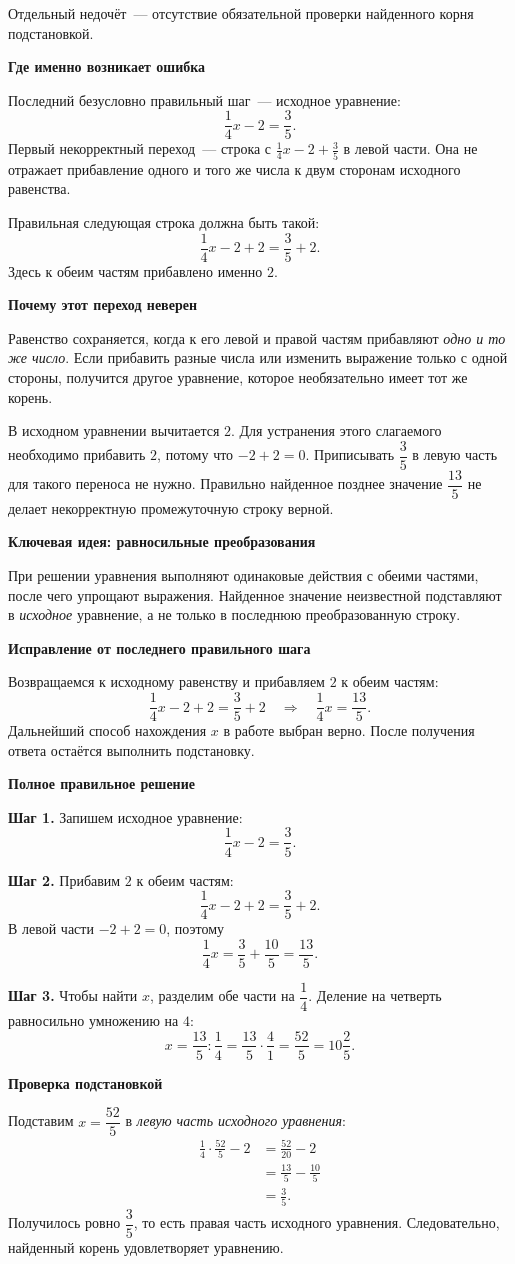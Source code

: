\documentclass[11pt,a4paper]{article}
\newcommand{\reviewpart}[1]{\par\smallskip\textbf{#1}\par\smallskip}
\begin{document}
Отдельный недочёт~--- отсутствие обязательной проверки найденного корня подстановкой.

\reviewpart{Где именно возникает ошибка}
Последний безусловно правильный шаг~--- исходное уравнение:
\[
\frac14x-2=\frac35.
\]
Первый некорректный переход~--- строка с $\frac14x-2+\frac35$ в левой части. Она не отражает прибавление одного и того же числа к двум сторонам исходного равенства.

Правильная следующая строка должна быть такой:
\[
\frac14x-2+2=\frac35+2.
\]
Здесь к обеим частям прибавлено именно $2$.

\reviewpart{Почему этот переход неверен}
Равенство сохраняется, когда к его левой и правой частям прибавляют \emph{одно и то же число}. Если прибавить разные числа или изменить выражение только с одной стороны, получится другое уравнение, которое необязательно имеет тот же корень.

В исходном уравнении вычитается $2$. Для устранения этого слагаемого необходимо прибавить $2$, потому что $-2+2=0$. Приписывать $\dfrac35$ в левую часть для такого переноса не нужно. Правильно найденное позднее значение $\dfrac{13}{5}$ не делает некорректную промежуточную строку верной.

\clearpage
\reviewpart{\textcolor{blue!60!black}{Ключевая идея:} равносильные преобразования}
При решении уравнения выполняют одинаковые действия с обеими частями, после чего упрощают выражения. Найденное значение неизвестной подставляют в \emph{исходное} уравнение, а не только в последнюю преобразованную строку.

\reviewpart{Исправление от последнего правильного шага}
Возвращаемся к исходному равенству и прибавляем $2$ к обеим частям:
\[
\frac14x-2+2=\frac35+2
\quad\Longrightarrow\quad
\frac14x=\frac{13}{5}.
\]
Дальнейший способ нахождения $x$ в работе выбран верно. После получения ответа остаётся выполнить подстановку.

\reviewpart{Полное правильное решение}
\textbf{Шаг 1.} Запишем исходное уравнение:
\[
\frac14x-2=\frac35.
\]

\textbf{Шаг 2.} Прибавим $2$ к обеим частям:
\[
\frac14x-2+2=\frac35+2.
\]
В левой части $-2+2=0$, поэтому
\[
\frac14x=\frac35+\frac{10}{5}=\frac{13}{5}.
\]

\textbf{Шаг 3.} Чтобы найти $x$, разделим обе части на $\dfrac14$. Деление на четверть равносильно умножению на $4$:
\[
x=\frac{13}{5}:\frac14
  =\frac{13}{5}\cdot\frac41
  =\frac{52}{5}
  =10\frac25.
\]

\reviewpart{Проверка подстановкой}
Подставим $x=\dfrac{52}{5}$ в \emph{левую часть исходного уравнения}:
\[
\begin{aligned}
\frac14\cdot\frac{52}{5}-2
 &=\frac{52}{20}-2\\
 &=\frac{13}{5}-\frac{10}{5}\\
 &=\frac35.
\end{aligned}
\]
Получилось ровно $\dfrac35$, то есть правая часть исходного уравнения. Следовательно, найденный корень удовлетворяет уравнению.
\end{document}
